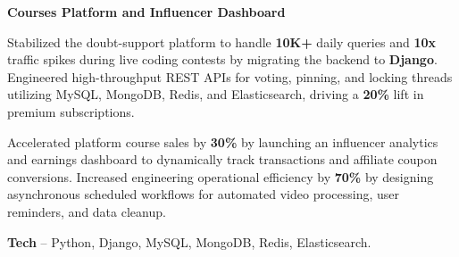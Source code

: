 \textcolor{Project}{\textbf{Courses Platform and Influencer Dashboard}}
\vspace{-0.88ex}
\begin{zitemize}
    \item Stabilized the doubt-support platform to handle \textbf{10K+} daily queries and \textbf{10x} traffic spikes during live coding contests by migrating the backend to \textbf{Django}. Engineered high-throughput REST APIs for voting, pinning, and locking threads utilizing MySQL, MongoDB, Redis, and Elasticsearch, driving a \textbf{20\%} lift in premium subscriptions.
    \item Accelerated platform course sales by \textbf{30\%} by launching an influencer analytics and earnings dashboard to dynamically track transactions and affiliate coupon conversions. Increased engineering operational efficiency by \textbf{70\%} by designing asynchronous scheduled workflows for automated video processing, user reminders, and data cleanup.
    \item \textbf{Tech} -- Python, Django, MySQL, MongoDB, Redis, Elasticsearch.
\end{zitemize}
